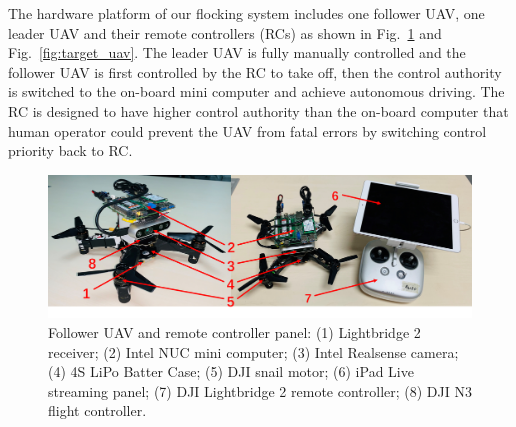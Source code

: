 The hardware platform of our flocking system includes one follower UAV, one leader UAV and their remote controllers (RCs) as shown in Fig.~\ref{fig:quadrotor_controller} and Fig.~\ref{fig:target_uav}. The leader UAV is fully manually controlled and the follower UAV is first controlled by the RC to take off, then the control authority is switched to the on-board mini computer and achieve autonomous driving. The RC is designed to have higher control authority than the on-board computer that human operator could prevent the UAV from fatal errors by switching control priority back to RC.

\begin{figure}[ht]
  \centering
  \includegraphics[width=1.0\textwidth]{figure/chapter_4/chaser_intro.png}
  \caption{Follower UAV and remote controller panel: (1) Lightbridge 2 receiver; (2) Intel NUC mini computer; (3) Intel Realsense camera; (4) 4S LiPo Batter Case; (5) DJI snail motor; (6) iPad Live streaming panel; (7) DJI Lightbridge 2 remote controller; (8) DJI N3 flight controller.}
  \label{fig:quadrotor_controller}
\end{figure}

